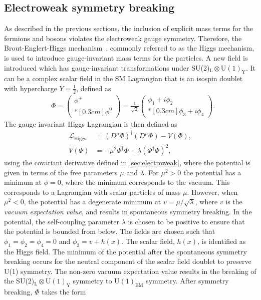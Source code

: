 \subsection{Electroweak symmetry breaking}\label{sec:symmbreak}
As described in the previous sections, the inclusion of explicit mass terms for the fermions and bosons violates the electroweak gauge symmetry. Therefore, the Brout-Englert-Higgs mechanism~\cite{Higgs1964,Englert1964}, commonly referred to as the Higgs mechanism, is used to introduce gauge-invariant mass terms for the particles. A new field is introduced which has gauge-invariant transformations under SU(2)$_\mathrm{L}\otimes\mathrm{U(1)}_\mathrm{Y}$. It can be a complex scalar field in the SM Lagrangian that is an isospin doublet with hypercharge $Y = \frac{1}{2}$, defined as
\begin{equation}\renewcommand*{\arraystretch}{\newarraystrech}
    \label{eq:scalarfield}
    \begin{aligned}
        & \Phi = 
        \begin{pmatrix}
            \phi^+ \\*[0.3cm]
            \phi^0 
        \end{pmatrix} =
        \frac{1}{\sqrt{2}} 
        \begin{pmatrix}
            \phi_1 + i\phi_2 \\*[0.3cm]
            \phi_3 + i\phi_4
        \end{pmatrix}.
     \end{aligned}
\end{equation}
The gauge invariant Higgs Lagrangian is then defined as
\begin{equation}
    \label{eq:lagrangianhiggs}
    \begin{aligned}
        \mathcal{L}_\mathrm{Higgs} &= (D^\mu\Phi)^\dagger(D^\mu\Phi) - V(\Phi), \\
        V(\Psi) &= - \mu^2\Phi^\dagger\Phi + \lambda(\Phi^\dagger\Phi)^2,
     \end{aligned}
\end{equation}
using the covariant derivative defined in \cref{sec:electroweak}, where the potential is given in terms of the free parameters $\mu$ and $\lambda$. For $\mu^2 > 0$ the potential has a minimum at $\phi = 0$, where the minimum corresponds to the vacuum. This corresponds to a Lagrangian with scalar particles of mass $\mu$. However, when $\mu^2 < 0$, the potential has a degenerate minimum at $v = \mu/\sqrt{\lambda}$, where $v$ is the \emph{vacuum expectation value}, and results in spontaneous symmetry breaking. In the potential, the self-coupling parameter $\lambda$ is chosen to be positive to ensure that the potential is bounded from below. The fields are chosen such that $\phi_1 = \phi_2 = \phi_4 = 0$ and $\phi_3 = v + h(x)$. The scalar field, $h(x)$, is identified as the Higgs field. The minimum of the potential after the spontaneous symmetry breaking occurs for the neutral component of the scalar field doublet to preserve U(1) symmetry. The non-zero vacuum expectation value results in the breaking of the SU(2)$_\mathrm{L}\otimes\mathrm{U(1)}_\mathrm{Y}$ symmetry to $\mathrm{U(1)}_\mathrm{EM}$ symmetry. After symmetry breaking, $\Phi$ takes the form 
